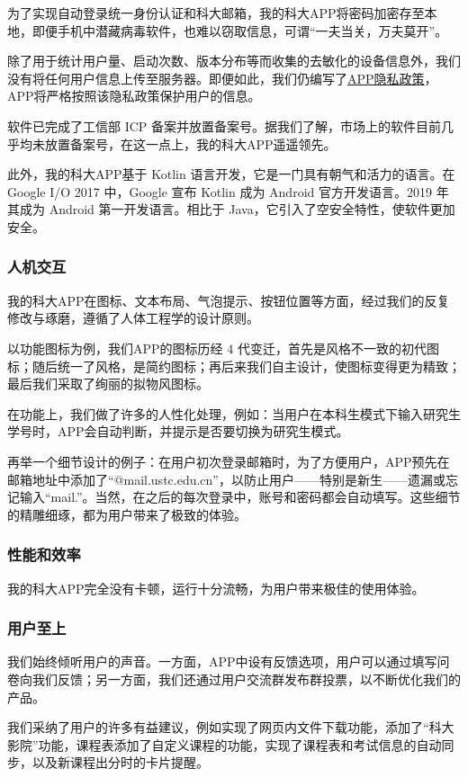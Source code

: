 为了实现自动登录统一身份认证和科大邮箱，我的科大APP将密码加密存至本地，即便手机中潜藏病毒软件，也难以窃取信息，可谓“一夫当关，万夫莫开”。

除了用于统计用户量、启动次数、版本分布等而收集的去敏化的设备信息外，我们没有将任何用户信息上传至服务器。即便如此，我们仍编写了\href{https://myustc.feixu.site/page/PrivacyPolicy.html}{{APP隐私政策}}，APP将严格按照该隐私政策保护用户的信息。

软件已完成了工信部 ICP 备案并放置备案号。据我们了解，市场上的软件目前几乎均未放置备案号，在这一点上，我的科大APP遥遥领先。

此外，我的科大APP基于 Kotlin 语言开发，它是一门具有朝气和活力的语言。在 Google I/O 2017 中，Google 宣布 Kotlin 成为 Android 官方开发语言。2019 年其成为 Android 第一开发语言。相比于 Java，它引入了空安全特性，使软件更加安全。

\subsubsection{人机交互}

我的科大APP在图标、文本布局、气泡提示、按钮位置等方面，经过我们的反复修改与琢磨，遵循了人体工程学的设计原则。

以功能图标为例，我们APP的图标历经 4 代变迁，首先是风格不一致的初代图标；随后统一了风格，是简约图标；再后来我们自主设计，使图标变得更为精致；最后我们采取了绚丽的拟物风图标。

在功能上，我们做了许多的人性化处理，例如：当用户在本科生模式下输入研究生学号时，APP会自动判断，并提示是否要切换为研究生模式。

再举一个细节设计的例子：在用户初次登录邮箱时，为了方便用户，APP预先在邮箱地址中添加了“@mail.ustc.edu.cn”，以防止用户——特别是新生——遗漏或忘记输入“mail.”。当然，在之后的每次登录中，账号和密码都会自动填写。这些细节的精雕细琢，都为用户带来了极致的体验。

\subsubsection{性能和效率}

我的科大APP完全没有卡顿，运行十分流畅，为用户带来极佳的使用体验。

\subsubsection{用户至上}

我们始终倾听用户的声音。一方面，APP中设有反馈选项，用户可以通过填写问卷向我们反馈；另一方面，我们还通过用户交流群发布群投票，以不断优化我们的产品。

我们采纳了用户的许多有益建议，例如实现了网页内文件下载功能，添加了“科大影院”功能，课程表添加了自定义课程的功能，实现了课程表和考试信息的自动同步，以及新课程出分时的卡片提醒。